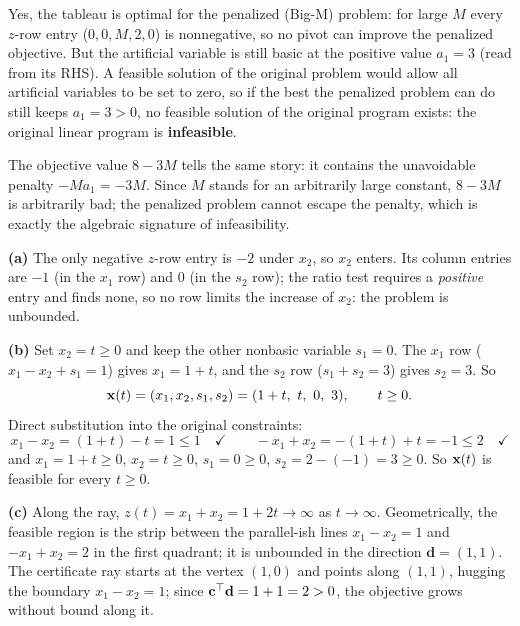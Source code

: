 Yes, the tableau is optimal for the penalized (Big-M) problem: for large
$M$ every $z$-row entry ($0, 0, M, 2, 0$) is nonnegative, so no pivot can
improve the penalized objective. But the artificial variable is still
basic at the positive value $a_1 = 3$ (read from its RHS). A feasible
solution of the original problem would allow all artificial variables to
be set to zero, so if the best the penalized problem can do still keeps
$a_1 = 3 > 0$, no feasible solution of the original program exists: the
original linear program is \textbf{infeasible}.

The objective value $8 - 3M$ tells the same story: it contains the
unavoidable penalty $-M a_1 = -3M$. Since $M$ stands for an arbitrarily
large constant, $8 - 3M$ is arbitrarily bad; the penalized problem cannot
escape the penalty, which is exactly the algebraic signature of
infeasibility.


\textbf{(a)} The only negative $z$-row entry is $-2$ under $x_2$, so
$x_2$ enters. Its column entries are $-1$ (in the $x_1$ row) and $0$
(in the $s_2$ row); the ratio test requires a \emph{positive} entry and
finds none, so no row limits the increase of $x_2$: the problem is
unbounded.

\textbf{(b)} Set $x_2 = t \geq 0$ and keep the other nonbasic variable
$s_1 = 0$. The $x_1$ row ($x_1 - x_2 + s_1 = 1$) gives $x_1 = 1 + t$,
and the $s_2$ row ($s_1 + s_2 = 3$) gives $s_2 = 3$. So
\[
\x(t) = (x_1, x_2, s_1, s_2) = (1 + t,\ t,\ 0,\ 3), \qquad t \geq 0.
\]
Direct substitution into the original constraints:
\[
x_1 - x_2 = (1 + t) - t = 1 \leq 1 \quad\checkmark
\qquad
-x_1 + x_2 = -(1 + t) + t = -1 \leq 2 \quad\checkmark
\]
and $x_1 = 1 + t \geq 0$, $x_2 = t \geq 0$, $s_1 = 0 \geq 0$,
$s_2 = 2 - (-1) = 3 \geq 0$. So $\mathbf{x}(t)$ is feasible for every
$t \geq 0$.

\textbf{(c)} Along the ray, $z(t) = x_1 + x_2 = 1 + 2t \to \infty$ as
$t \to \infty$. Geometrically, the feasible region is the strip between
the parallel-ish lines $x_1 - x_2 = 1$ and $-x_1 + x_2 = 2$ in the first
quadrant; it is unbounded in the direction $\mathbf{d} = (1, 1)$. The
certificate ray starts at the vertex $(1, 0)$ and points along
$(1, 1)$, hugging the boundary $x_1 - x_2 = 1$; since
$\mathbf{c}^\top \mathbf{d} = 1 + 1 = 2 > 0$, the objective grows without bound
along it.
